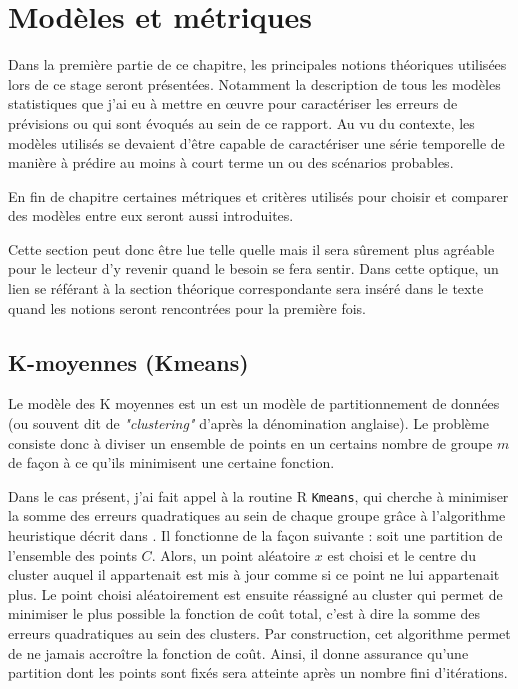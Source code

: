 \documentclass[12pt]{report}
\begin{document}
\chapter{Modèles et métriques}
Dans la première partie de ce chapitre, les principales notions théoriques utilisées lors de ce stage seront présentées. Notamment la description de tous les modèles statistiques que j'ai eu à mettre en œuvre pour caractériser les erreurs de prévisions ou qui sont évoqués au sein de ce rapport. Au vu du contexte, les modèles utilisés se devaient d'être capable de caractériser une série temporelle de manière à prédire au moins à court terme un ou des scénarios probables.

En fin de chapitre certaines métriques et critères utilisés pour choisir et comparer des modèles entre eux seront aussi introduites.

Cette section peut donc être lue telle quelle mais il sera sûrement plus agréable pour le lecteur d'y revenir quand le besoin se fera sentir. Dans cette optique, un lien se référant à la section théorique correspondante sera inséré dans le texte quand les notions seront rencontrées pour la première fois.

\section{K-moyennes (Kmeans)}
\label{sec:Kmeans}

Le modèle des K moyennes est un est un modèle de partitionnement de données (ou souvent dit de \textit{"clustering"} d'après la dénomination anglaise). Le problème consiste donc à diviser un ensemble de points en un certains nombre de groupe $m$ de façon à ce qu'ils minimisent une certaine fonction.

Dans le cas présent, j'ai fait appel à la routine R \texttt{Kmeans}, qui cherche à minimiser la somme des erreurs quadratiques au sein de chaque groupe grâce à l'algorithme heuristique décrit dans \cite{hartigan_algorithm_1979}. Il fonctionne de la façon suivante : soit une partition de l'ensemble des points $C$. Alors, un point aléatoire $x$ est choisi et le centre du cluster auquel il appartenait est mis à jour comme si ce point ne lui appartenait plus. Le point choisi aléatoirement est ensuite réassigné au cluster qui permet de minimiser le plus possible la fonction de coût total, c'est à dire la somme des erreurs quadratiques au sein des clusters. Par construction, cet algorithme permet de ne jamais accroître la fonction de coût. Ainsi, il donne assurance qu'une partition dont les points sont fixés sera atteinte après un nombre fini d'itérations.
\end{document}

